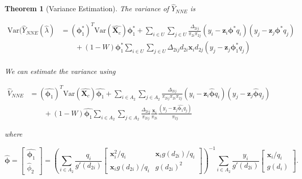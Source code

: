 \documentclass[12pt]{article}
\newtheorem{theorem}{Theorem}
\newcommand{\Var}{{\text{Var}}}
\renewcommand{\bf}[1]{\mathbf{#1}}
\begin{document}
\begin{theorem}[Variance Estimation]\label{thm:nnve}
  The variance of $\hat Y_{NNE}$ is 

  \begin{align*}
    \Var(\hat Y_{NNE}(\hat \lambda)
    &= (\bm \phi_1^*)^T \Var(\hat{\bf X_c}) \bm \phi_1^* + 
    \sum_{i \in U} \sum_{j \in U} \frac{\Delta_{2ij}}{\pi_{2i}\pi_{2j}} 
      (y_i - \bf z_i \bm \phi^* q_i)(y_j - \bf z_j \bm \phi^* q_j)\\
    &\qquad + (1 - W)\bm \phi_1^* \sum_{i \in U} \sum_{j \in U} \Delta_{2ij}
    d_{2i} \bf x_i d_{2j}(y_j - \bf z_j \bm \phi^*_1 q_j)\\
  \end{align*}

  We can estimate the variance using

  \begin{align*}
    \hat V_{NNE} 
    &= (\hat{\bm \phi_1})^T \Var(\hat{\bf X_c}) \hat{\bm \phi_1} + 
    \sum_{i \in A_2} \sum_{j \in A_2} \frac{\Delta_{2ij}}{\pi_{2ij}\pi_{2i}\pi_{2j}} 
    (y_i - \bf z_i \hat{\bm \phi} q_i)(y_j - \bf z_j \hat{\bm \phi} q_j) \\
    &\qquad + (1 - W)\hat{\bm \phi_1} \sum_{i \in A_2} \sum_{j \in A_2} \frac{\Delta_{2ij}}{\pi_{2ij}}
    \frac{\bf x_i}{\pi_{2i}} \frac{(y_j - \bf z_j \hat{\bm \phi_1} q_j)}{\pi_{2j}}
  \end{align*}

  where 
  
  $$\hat{\bm \phi} =
  \begin{bmatrix}
    \hat{\bm \phi_1} \\ \hat \phi_2
  \end{bmatrix} = 
  \left(\sum_{i \in A_2} \frac{q_i}{g'(d_{2i})} 
  \begin{bmatrix}
    \bf x_i^2 / q_i & \bf x_i g(d_{2i}) / q_i \\
    \bf x_i g(d_{2i}) / q_i & g(d_{2i})^2
  \end{bmatrix}
  \right)^{-1}
  \sum_{i \in A_2} \frac{y_i}{g'(d_{2i})} 
  \begin{bmatrix} \bf x_i / q_i \\ g(d_i) \end{bmatrix}.
  $$
\end{theorem}
\end{document}
